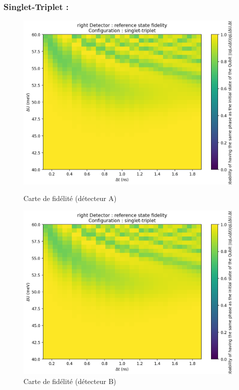 \documentclass{article}
\begin{document}
\subsubsection{Singlet-Triplet :}

\begin{figure}[H]
  \centering
  \begin{minipage}[c]{0.48\textwidth}
    \centering
    \includegraphics[width=\textwidth]{p_detector_overlap_map_33x33_20250822-003725_faible.png}
    \caption{Carte de fidélité (détecteur A)}
    \label{fig:fidelity_map_a}
  \end{minipage}\hfill
  \begin{minipage}[c]{0.48\textwidth}
    \centering
    \includegraphics[width=\textwidth]{p_detector_overlap_map_33x33_20250822-003725_faible.png}
    \caption{Carte de fidélité (détecteur B)}
    \label{fig:fidelity_map_b}
  \end{minipage}
\end{figure}
\end{document}
